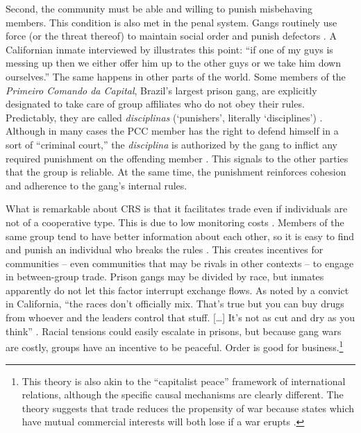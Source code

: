\documentclass[a4paper, 12pt]{article}
\begin{document}
Second, the community must be able and willing to punish misbehaving members. This condition is also met in the penal system. Gangs routinely use force (or the threat thereof) to maintain social order and punish defectors \citep{skarbek2011governance,skarbek2012prison,skarbek2014social}. A Californian inmate interviewed by \citet[p. 763]{trammell2009values} illustrates this point: ``if one of my guys is messing up then we either offer him up to the other guys or we take him down ourselves.'' The same happens in other parts of the world. Some members of the \textit{Primeiro Comando da Capital}, Brazil's largest prison gang, are explicitly designated to take care of group affiliates who do not obey their rules. Predictably, they are called \textit{disciplinas} (`punishers', literally `disciplines') \citep{biondi2010junto,dias2009guerra}. Although in many cases the PCC member has the right to defend himself in a sort of ``criminal court,'' the \textit{disciplina} is authorized by the gang to inflict any required punishment on the offending member \citep{dias2011pulverizaccao,marques2010liderancca}. This signals to the other parties that the group is reliable. At the same time, the punishment reinforces cohesion and adherence to the gang's internal rules. 

What is remarkable about CRS is that it facilitates trade even if individuals are not of a cooperative type. This is due to low monitoring costs \citep{biais1997trade,carletti2004structure,jain2001monitoring}. Members of the same group tend to have better information about each other, so it is easy to find and punish an individual who breaks the rules \citep{greif2006institutions}. This creates incentives for communities -- even communities that may be rivals in other contexts -- to engage in between-group trade. Prison gangs may be divided by race, but inmates apparently do not let this factor interrupt exchange flows. As noted by a convict in California, ``the races don't officially mix. That's true but you can buy drugs from whoever and the leaders control that stuff. [\dots] It's not as cut and dry as you think'' \citep[p. 756]{trammell2009values}. Racial tensions could easily escalate in prisons, but because gang wars are costly, groups have an incentive to be peaceful. Order is good for business.\footnote{This theory is also akin to the ``capitalist peace'' framework of international relations, although the specific causal mechanisms are clearly different. The theory suggests that trade reduces the propensity of war because states which have mutual commercial interests will both lose if a war erupts \citep[e.g.][]{gartzke2007capitalist, kant1795ewigen, levy2011causes}.}
\end{document}
